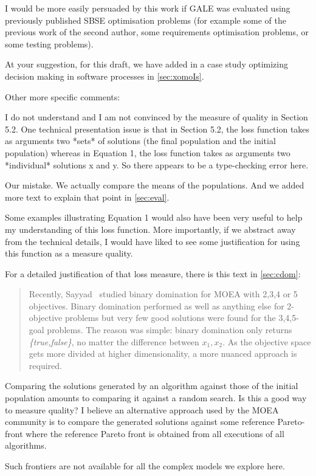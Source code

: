 \documentclass[10pt,journal,compsoc]{IEEEtran}
\newcommand{\tion}[1]{\textsection\ref{sec:#1}}
\newenvironment{changed}{\par}{\par}
\begin{document}
I
 would be more easily persuaded by this work if GALE
 was evaluated using previously published SBSE
 optimisation problems (for example some of the
 previous work of the second author, some
 requirements optimisation problems, or some testing
 problems). 
\begin{changed}
At your suggestion,
for this draft, we have added in a case study optimizing decision making in software processes in  \tion{xomoIs}.

\end{changed}

Other more specific comments:

I do not understand and I am not convinced by the measure of quality in Section 5.2. One technical presentation issue is that in Section 5.2, the loss function takes as arguments two *sets* of solutions (the final population and the initial population) whereas in Equation 1, the loss function takes as arguments two *individual* solutions x and y. So there appears to be a type-checking error here. 

\begin{changed}
Our mistake. We actually compare the means of the populations.
And we added more text to explain that point in \tion{eval}.

\end{changed}

Some examples illustrating Equation 1 would also have been very useful to help my understanding of this loss function. More importantly, if we abstract away from the technical details, I would have liked to see some justification for using this function as a measure quality. 
\begin{changed}
For a detailed justification of that loss measure, there is this text in \tion{cdom}:

\begin{quote}
 Recently, Sayyad~\cite{sayyad13a} studied binary domination for MOEA
with 2,3,4 or 5 objectives.  Binary domination performed as well as anything else
for 2-objective problems but very few good solutions were found for
the 3,4,5-goal problems.  The reason was simple: binary domination  only returns
{\em \{true,false\}}, no matter the difference between $x_1,x_2$. As the objective
space gets more divided at higher dimensionality, a more nuanced approach is required.
\end{quote}

\end{changed}

Comparing the solutions generated by an algorithm against those of the initial population amounts to comparing it against a random search. Is this a good way to measure quality? I believe an alternative approach used by the MOEA community is to compare the generated solutions against some reference Pareto-front where the reference Pareto front is obtained from all executions of all algorithms. 
\begin{changed}
Such frontiers are not available for all the complex models we explore here.
\end{changed}
\end{document}
